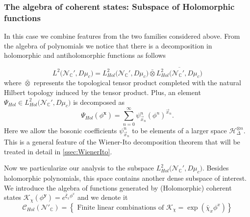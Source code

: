 \documentclass[12pt]{article}%
\begin{document}
 
\subsubsection{The algebra of coherent states: Subspace of Holomorphic functions}

In this case we combine features from the two families considered above. From the algebra of polynomials we notice that there is a decomposition in holomorphic and antiholomorphic functions as follows

\begin{equation}
    \label{eq:ComplexHilbertspacedecomp}
    L^2\big({\mathcal{N}_{\mathbb{C}}'},D\mu_c\big)= L^2_{Hol}\big({\mathcal{N}_{\mathbb{C}}'}, D\mu_c\big)\bar{\otimes}\overline{ L^2_{{Hol}}\big({\mathcal{N}_{\mathbb{C}}'}, D\mu_c\big)}
    \end{equation}
    where $\bar{\otimes}$ represents the topological tensor product completed with the natural Hilbert topology induced by the tensor product. Plus, an element $\Psi_{Hol}\in L^2_{Hol}\big({\mathcal{N}_{\mathbb{C}}'},D\mu_c\big) $ is decomposed as    \begin{equation}
        \label{eq:chaosdecompositionhol}
        \Psi_{Hol}(\phi^{\mathbf{x}})=\sum_{n=0}^\infty\psi^{n}_{\vec{x}_n}(\phi^n)^{\vec{x}_n}.
    \end{equation}
    Here we allow the bosonic coefficients $\psi^{n}_{\vec{x}_n}$ to be elements of a larger space $\mathcal{H}_\Delta^{\otimes n}$. This is a general feature of the Wiener-Ito decomposition theorem that will be treated in detail in \autoref{ssec:WienerIto}.


Now we particularize our analysis to the subspace $L^2_{Hol}\big({\mathcal{N}_{\mathbb{C}}'},D\mu_c\big)$. Besides holomorphic polynomials, this space  contains another dense subspace of interest. We introduce the algebra of functions generated by (Holomorphic) coherent states $\mathcal{K}_{\chi}(\phi^{\mathbf{y}})=e^{\bar\xi_x\phi^x}$ and we denote it 
\begin{equation}
    \label{eq:CoherentStates}
    \mathcal{C}_{Hol}(\mathcal{N}'_\mathbb{C})=\left\{\textrm{ Finite linear combinations of }  \mathcal{K}_{\chi}=\exp\left(\bar\chi_x\phi^x\right)\right\}
    \end{equation}
\end{document}
